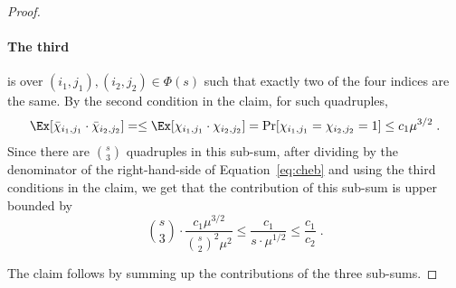 \begin{proof}
\paragraph{The third} is over $(i_1,j_1), (i_2,j_2) \in \Phi(s)$ such that exactly two of the four indices are the same. By the second condition in the claim, for such quadruples,
\begin{equation}\label{eq:cheb-case3}
\Ex[\bar{\chi}_{i_1,j_1}\cdot \bar{\chi}_{i_2,j_2}]  =
\leq \Ex[\chi_{i_1,j_1}\cdot \chi_{i_2,j_2}] = \Pr[\chi_{i_1,j_1}=\chi_{i_2,j_2}=1] \leq c_1\mu^{3/2}\;.
\end{equation}
Since there are  ${s\choose 3}$ quadruples in this sub-sum, after dividing by the denominator of the right-hand-side of Equation~\eqref{eq:cheb} and using the  third conditions in the claim, we get that the contribution of this sub-sum is upper bounded by
\begin{equation}
{s\choose 3} \cdot \frac{c_1\mu^{3/2}}{{s\choose 2}^2 \mu^2} \leq \frac{c_1}{s\cdot \mu^{1/2}}\leq \frac{c_1}{c_2}\;.
\end{equation}

The claim follows by summing up the contributions of the three sub-sums.
\end{proof}
\fi



